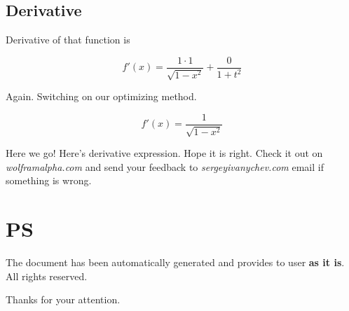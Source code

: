 \documentclass[a4paper, 12pt]{report}
\begin{document}
\section{Derivative}

Derivative of that function is

$$
\boxed{
f'(x) = 
\frac{1 \cdot 1}{\sqrt{1 - x^{2}} } + \frac{0}{1 + t^{2}}
}
$$

Again. Switching on our optimizing method.

$$
\boxed{
f'(x) = 
\frac{1}{\sqrt{1 - x^{2}} }
}
$$

Here we go! Here's derivative expression. 
Hope it is right.
Check it out on {\sl{}wolframalpha.com} and send your feedback to {\sl{}sergeyivanychev.com} email if something is wrong.

\chapter{PS}
The document has been automatically generated and provides to user {\bf{}as it is}. All rights reserved.

Thanks for your attention.
\end{document}
